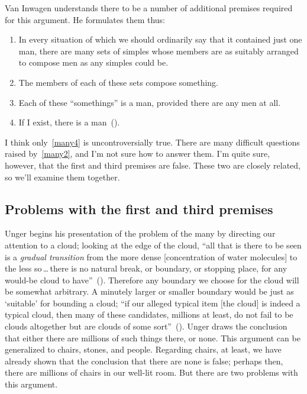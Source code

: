 \documentclass[11pt]{standalone} \newif\ifstandlone \standalonetrue
\begin{document}
\begin{spacing}{1.5}
Van Inwagen understands there to be a number of additional premises
required for this argument.  He formulates them thus:
\begin{enumerate}
	\item In every situation of which we should ordinarily say
          that it contained just one man, there are many sets of
          simples whose members are as suitably arranged to compose
          men as any simples could be.  \label{many1}
	\item The members of each of these sets compose
          something.  \label{many2}
	\item Each of these ``somethings'' is a man, provided there
          are any men at all.  \label{many3}
	\item If I exist, there is a
          man~(\citeyear[216]{inwagen1995}).  \label{many4}
\end{enumerate}
I think only~\ref{many4} is uncontroversially true.  There are many
difficult questions raised by~\ref{many2}, and I'm not sure how to
answer them.  I'm quite sure, however, that the first and third
premises are false.  These two are closely related, so we'll examine
them together.

\subsection{Problems with the first and third premises}
\label{many13p}
Unger begins his presentation of the problem of the many by directing
our attention to a cloud; looking at the edge of the cloud, ``all that
is there to be seen is a {\em gradual transition} from the more dense
[concentration of water molecules] to the less so\,\ldots\,there is no
natural break, or boundary, or stopping place, for any would-be cloud
to have''~(\citeyear[415]{unger1980a}).  Therefore any boundary we
choose for the cloud will be somewhat arbitrary.  A minutely larger or
smaller boundary would be just as `suitable' for bounding a cloud;
``if our alleged typical item [the cloud] is indeed a typical cloud,
then many of these candidates, millions at least, do not fail to be
clouds altogether but are clouds of some
sort''~(\citeyear[421]{unger1980a}).  Unger draws the conclusion that
either there are millions of such things there, or none.  This
argument can be generalized to chairs, stones, and people.  Regarding
chairs, at least, we have already shown that the conclusion that there
are none is false; perhaps then, there are millions of chairs in our
well-lit room.  But there are two problems with this argument.


\end{spacing}
\end{document}
